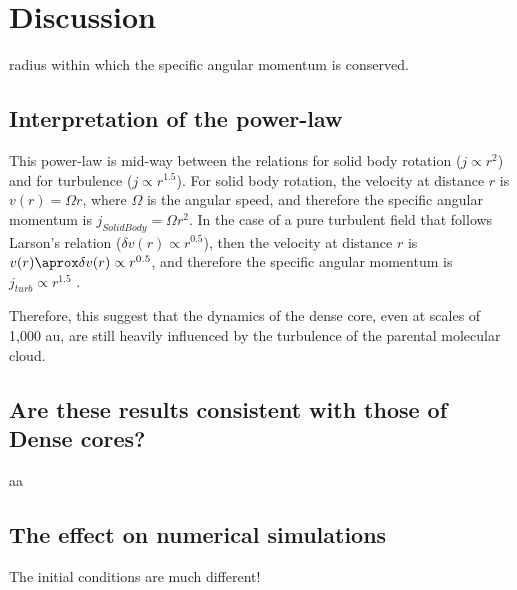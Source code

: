 \section{Discussion}


radius within which the specific angular momentum is conserved. 

\subsection{Interpretation of the power-law}
This power-law is mid-way between the relations for solid body rotation ($j\propto r^{2}$) and for turbulence ($j\propto r^{1.5}$). 
For solid body rotation, the velocity at distance $r$ is $v(r)=\Omega r$, 
where $\Omega$ is the angular speed, 
and therefore the specific angular momentum is $j_{SolidBody}=\Omega r^2$. 
In the case of a pure turbulent field that follows Larson's relation ($\delta v(r) \propto r^{0.5}$), 
then the velocity at distance $r$ is $v(r)\aprox \delta v(r) \propto r^{0.5}$, 
and therefore the specific angular momentum is $j_{turb}\propto r^{1.5}$ \citep{Burkert_2000}. 

Therefore, this suggest that the dynamics of the dense core, even at scales of 1,000 au, are still 
heavily influenced by the turbulence of the parental molecular cloud.

\subsection{Are these results consistent with those of Dense cores?}
aa

\subsection{The effect on numerical simulations}
The initial conditions are much different!
 

  